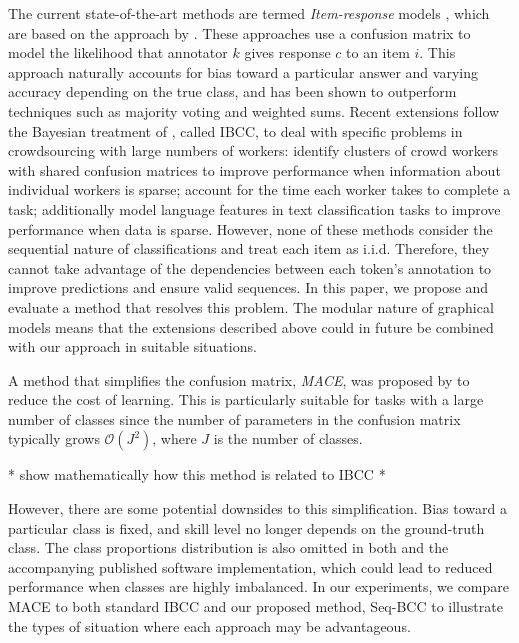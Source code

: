 The current state-of-the-art methods are termed \emph{Item-response} models \cite{Felt2016SemanticAA},
which are based on the approach by \cite{dawid_maximum_1979}. These approaches use a confusion matrix
to model the likelihood that annotator $k$ gives response $c$ to an item $i$. 
This approach naturally accounts for bias toward a particular answer and varying accuracy 
depending on the true class, and has been 
shown to outperform techniques such as majority voting and weighted sums\cite{simpsonlong,raykar12,kim2003}.
Recent extensions follow the Bayesian treatment of \cite{kim2003}, called IBCC,
to deal with specific problems in crowdsourcing with large numbers of workers:
\cite{moreno_bayesian_2015,venanzi2014community} identify clusters of crowd workers
with shared confusion matrices to improve performance when information about individual workers is sparse;
\cite{venanzi2016time} account for the time each worker takes to complete a task;
\cite{Felt2016SemanticAA, simpson2015language} additionally model language features in text classification tasks
to improve performance when data is sparse.
However, none of these methods consider the sequential nature of classifications and treat each item as i.i.d.
Therefore, they cannot take advantage of the dependencies between each token's annotation to improve
predictions and ensure valid sequences. 
In this paper, we propose and evaluate a method that resolves this problem. 
The modular nature of graphical models means that the extensions described above could in future be combined
with our approach in suitable situations.

A method that simplifies the confusion matrix, \emph{MACE}, was proposed by \cite{hovy2013learning}
to reduce the cost of learning. This is particularly suitable for tasks with a large number of classes
since the number of parameters in the confusion matrix typically grows $\mathcal{O}(J^2)$, where $J$ is the number of classes.

* show mathematically how this method is related to IBCC *

However, there are some potential downsides to this simplification. Bias toward a particular class is fixed,
and skill level no longer depends on the ground-truth class. The class proportions distribution is also omitted
in both \cite{hovy2013learning} and the accompanying published software implementation, which
could lead to reduced performance when classes are highly imbalanced. 
In our experiments, we compare MACE to both standard IBCC and our proposed method, Seq-BCC to illustrate the 
types of situation where each approach may be advantageous. 

